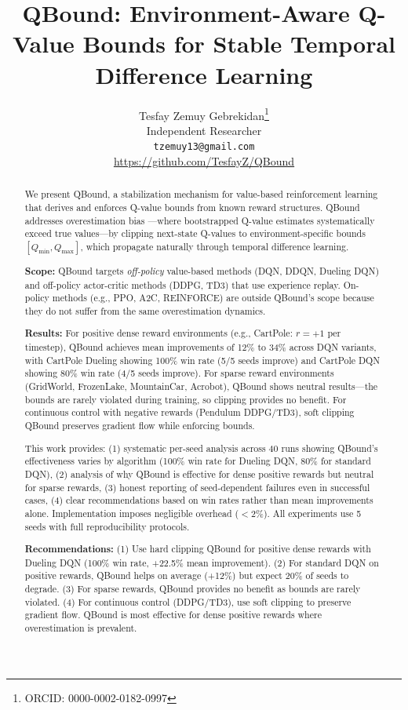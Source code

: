 \documentclass[11pt]{article}
\title{QBound: Environment-Aware Q-Value Bounds for Stable Temporal Difference Learning}
\author{
  Tesfay Zemuy Gebrekidan\thanks{ORCID: 0000-0002-0182-0997} \\
  Independent Researcher \\
  \texttt{tzemuy13@gmail.com} \\
  \url{https://github.com/TesfayZ/QBound}
}
\theoremstyle{definition}
\theoremstyle{remark}
\begin{document}
\maketitle

\begin{abstract}
We present QBound, a stabilization mechanism for value-based reinforcement learning that derives and enforces Q-value bounds from known reward structures. QBound addresses overestimation bias \citep{thrun1993issues, van2016deep}---where bootstrapped Q-value estimates systematically exceed true values---by clipping next-state Q-values to environment-specific bounds $[Q_{\min}, Q_{\max}]$, which propagate naturally through temporal difference learning.

\textbf{Scope:} QBound targets \textit{off-policy} value-based methods (DQN, DDQN, Dueling DQN) and off-policy actor-critic methods (DDPG, TD3) that use experience replay. On-policy methods (e.g., PPO, A2C, REINFORCE) are outside QBound's scope because they do not suffer from the same overestimation dynamics.

\textbf{Results:} For positive dense reward environments (e.g., CartPole: $r = +1$ per timestep), QBound achieves mean improvements of 12\% to 34\% across DQN variants, with CartPole Dueling showing 100\% win rate (5/5 seeds improve) and CartPole DQN showing 80\% win rate (4/5 seeds improve). For sparse reward environments (GridWorld, FrozenLake, MountainCar, Acrobot), QBound shows neutral results---the bounds are rarely violated during training, so clipping provides no benefit. For continuous control with negative rewards (Pendulum DDPG/TD3), soft clipping QBound preserves gradient flow while enforcing bounds.

This work provides: (1) systematic per-seed analysis across 40 runs showing QBound's effectiveness varies by algorithm (100\% win rate for Dueling DQN, 80\% for standard DQN), (2) analysis of why QBound is effective for dense positive rewards but neutral for sparse rewards, (3) honest reporting of seed-dependent failures even in successful cases, (4) clear recommendations based on win rates rather than mean improvements alone. Implementation imposes negligible overhead ($<$2\%). All experiments use 5 seeds with full reproducibility protocols.

\textbf{Recommendations:} (1) Use hard clipping QBound for positive dense rewards with Dueling DQN (100\% win rate, +22.5\% mean improvement). (2) For standard DQN on positive rewards, QBound helps on average (+12\%) but expect 20\% of seeds to degrade. (3) For sparse rewards, QBound provides no benefit as bounds are rarely violated. (4) For continuous control (DDPG/TD3), use soft clipping to preserve gradient flow. QBound is most effective for dense positive rewards where overestimation is prevalent.
\end{abstract}
\end{document}
